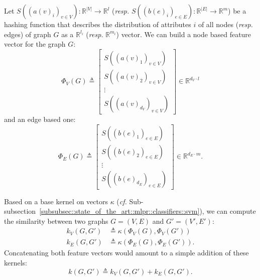                 Let $S\left(\left(a(v)_i\right)_{v\in V}\right): \mathbb{R}^{\vert V\vert} \rightarrow \mathbb{R}^l$ (\textit{resp.} $S\left(\left(b(e)_i\right)_{e\in E}\right): \mathbb{R}^{\vert E\vert} \rightarrow \mathbb{R}^{m}$) be a hashing function that describes the distribution of attributes $i$ of all nodes (\textit{resp.} edges) of graph $G$ as a $\mathbb{R}^{l_i}$ (\textit{resp.} $\mathbb{R}^{m_i}$) vector.
                We can build a node based feature vector for the graph $G$:
                \begin{equation}
                    \label{eq::feature_node_graph}
                    \Phi_V(G) \triangleq \begin{bmatrix}
                        S\left(\left(a(v)_1\right)_{v\in V}\right)\\
                        S\left(\left(a(v)_2\right)_{v\in V}\right)\\
                        \vdots\\
                        S\left(\left(a(v)_{d_V}\right)_{v\in V}\right)
                    \end{bmatrix} \in \mathbb{R}^{d_V \cdot l}
                \end{equation}
                and an edge based one:
                \begin{equation}
                    \label{eq::feature_edge_graph}
                    \Phi_E(G) \triangleq \begin{bmatrix}
                        S\left(\left(b(e)_1\right)_{e \in E}\right)\\
                        S\left(\left(b(e)_2\right)_{e \in E}\right)\\
                        \vdots\\
                        S\left(\left(b(e)_{d_E}\right)_{e \in E}\right)
                    \end{bmatrix} \in \mathbb{R}^{d_E \cdot m}.
                \end{equation}

                Based on a base kernel on vectors $\kappa$ (\textit{cf.} Sub-subsection~\ref{subsubsec::state_of_the_art::mlpr::classifiers::svm}), we can compute the similarity between two graphs $G = \left(V, E\right)$ and $G' = \left(V', E'\right)$:
                \begin{align}
                    \label{eq::feature_graph_kernel_nodes}
                    k_V(G, G') &\triangleq \kappa(\Phi_V(G), \Phi_V(G'))\\
                    \label{eq::feature_graph_kernel_edges}
                    k_E(G, G') &\triangleq \kappa(\Phi_E(G), \Phi_E(G')).
                \end{align}
                Concatenating both feature vectors would amount to a simple addition of these kernels:
                \begin{equation}
                    \label{eq::feature_graph_kernel_sum}
                    k(G, G') \triangleq k_V(G, G') + k_E(G, G').
                \end{equation}

